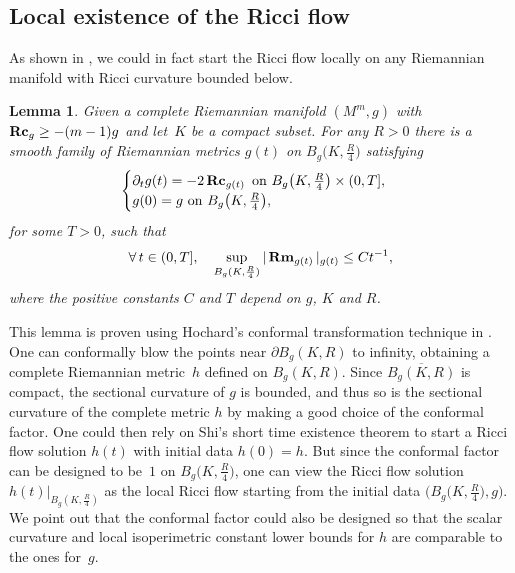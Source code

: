 \documentclass[10pt,a4paper]{amsart}
\numberwithin{equation}{section}
\newtheorem{Lemma}[Theorem]{Lemma}
\newcommand{\Rm}{\operatorname{\bf Rm}}
\newcommand{\Rc}{\operatorname{\bf Rc}}
\begin{document}
\subsection{Local existence of the Ricci flow}\label{section4.1}
As shown in \cite[Lemma 2.2]{HW20b}, we could in fact start the Ricci flow
locally on any Riemannian manifold with Ricci curvature bounded below.
\begin{Lemma}\label{lem: HW20b0}
Given a complete Riemannian manifold $(M^m,g)$ with $\Rc_g\ge -(m-1)g$ and let~$K$ be a compact subset. For any $R>0$ there is a smooth family of Riemannian
metrics $g(t)$ on $B_g\big(K,\frac{R}{4}\big)$ satisfying
\begin{align*}
\begin{cases}
\partial_tg(t) = -2\Rc_{g(t)}\ \text{on}\ B_g\big(K,\frac{R}{4}\big)\times (0,T],\\
g(0) = g\ \text{on}\ B_g\big(K,\frac{R}{4}\big),
\end{cases}
\end{align*}
for some $T>0$, such that
\begin{align*}
\forall\, t\in (0,T],\quad
\sup_{B_g(K,\frac{R}{4})} |\Rm_{g(t)} |_{g(t)} \le Ct^{-1},
\end{align*}
where the positive constants $C$ and $T$ depend on $g$, $K$ and $R$.
\end{Lemma}
This lemma is proven using Hochard's conformal transformation technique in
\cite[Section~6]{Hochard16}. One can conformally blow the points near $\partial
B_g(K,R)$ to infinity, obtaining a complete Riemannian metric~$h$ defined on
$B_g(K,R)$. Since $\overline{B_g(K,R)}$ is compact, the sectional curvature of
$g$ is bounded, and thus so is the sectional curvature of the complete metric
$h$ by making a good choice of the conformal factor. One could then rely on
Shi's short time existence theorem to start a Ricci flow solution $h(t)$ with
initial data $h(0)=h$. But since the conformal factor can be designed to be~$1$
on $B_g\big(K,\frac{R}{4}\big)$, one can view the Ricci flow solution
$h(t)|_{B_g(K,\frac{R}{4})}$ as the local Ricci flow starting from the initial
data $\big(B_g\big(K,\frac{R}{4}\big),g\big)$. We point out that the conformal factor could
also be designed so that the scalar curvature and local isoperimetric constant
lower bounds for $h$ are comparable to the ones for~$g$.
\end{document}

